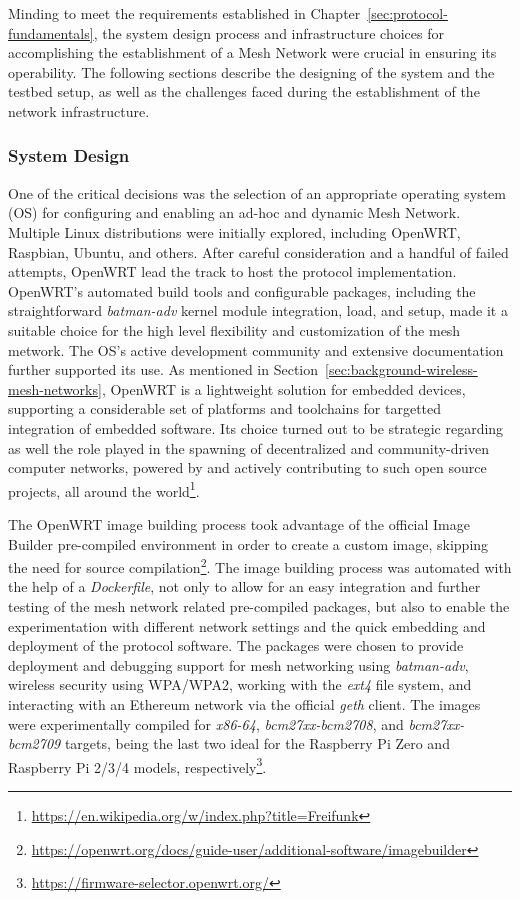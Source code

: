 Minding to meet the requirements established in Chapter~\ref{sec:protocol-fundamentals}, the system design process and infrastructure choices for accomplishing the establishment of a Mesh Network were crucial in ensuring its operability. The following sections describe the designing of the system and the testbed setup, as well as the challenges faced during the establishment of the network infrastructure.

\subsubsection{System Design} \label{sec:infrastructure}

One of the critical decisions was the selection of an appropriate operating system (OS) for configuring and enabling an ad-hoc and dynamic Mesh Network. Multiple Linux distributions were initially explored, including OpenWRT, Raspbian, Ubuntu, and others. After careful consideration and a handful of failed attempts, OpenWRT lead the track to host the protocol implementation. OpenWRT's automated build tools and configurable packages, including the straightforward \emph{batman-adv} kernel module integration, load, and setup, made it a suitable choice for the high level flexibility and customization of the mesh metwork. The OS's active development community and extensive documentation further supported its use. As mentioned in Section~\ref{sec:background-wireless-mesh-networks}, OpenWRT is a lightweight solution for embedded devices, supporting a considerable set of platforms and toolchains for targetted integration of embedded software. Its choice turned out to be strategic regarding as well the role played in the spawning of decentralized and community-driven computer networks, powered by and actively contributing to such open source projects, all around the world\footnote{\url{https://en.wikipedia.org/w/index.php?title=Freifunk}}.

The OpenWRT image building process took advantage of the official Image Builder pre-compiled environment in order to create a custom image, skipping the need for source compilation\footnote{\url{https://openwrt.org/docs/guide-user/additional-software/imagebuilder}}. The image building process was automated with the help of a \emph{Dockerfile}, not only to allow for an easy integration and further testing of the mesh network related pre-compiled packages, but also to enable the experimentation with different network settings and the quick embedding and deployment of the \pol{} protocol software. The packages were chosen to provide deployment and debugging support for mesh networking using \emph{batman-adv}, wireless security using WPA/WPA2, working with the \emph{ext4} file system, and interacting with an Ethereum network via the official \emph{geth} client. The images were experimentally compiled for \emph{x86-64}, \emph{bcm27xx-bcm2708}, and \emph{bcm27xx-bcm2709} targets, being the last two ideal for the Raspberry Pi Zero and Raspberry Pi 2/3/4 models, respectively\footnote{\url{https://firmware-selector.openwrt.org/}}.

